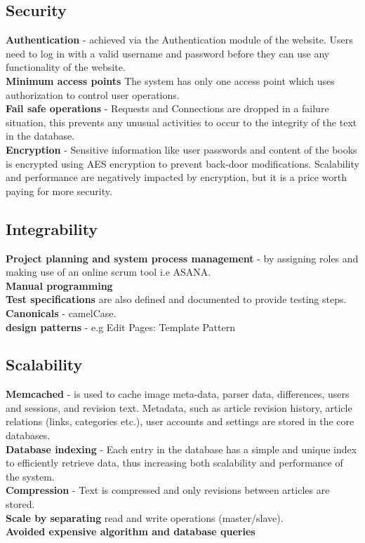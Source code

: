 \subsection{Security}
\par{\textbf{Authentication} - achieved via the Authentication module of the website. Users need to log in with a valid username and password before they can use any functionality of the website. 
\\\textbf{Minimum access points}  The system has only one access point which uses authorization to control user operations.
\\\textbf{Fail safe operations} - Requests and Connections are dropped in a failure situation, this prevents any unusual activities to occur to the integrity of the text in the database.
\\\textbf{Encryption} - Sensitive information like user passwords and content of the books is encrypted using AES encryption to prevent back-door modifications. Scalability and performance are negatively impacted by encryption, but it is a price worth paying for more security.
 }

\subsection{Integrability}
\par{\textbf{Project planning and system process management} - by assigning roles and making use of an online scrum tool i.e ASANA.
\\\textbf{Manual programming}
\\\textbf{Test specifications} are also defined and documented to provide testing steps.
\\\textbf{Canonicals} - camelCase.
\\\textbf{design patterns} - e.g Edit Pages: Template Pattern}

\subsection{Scalability}
\par{\textbf{Memcached} - is used to cache image meta-data, parser data, differences, users and sessions, and revision text. Metadata, such as article revision history, article relations (links, categories etc.), user accounts and settings are stored in the core databases.
\\\textbf{Database indexing} - Each entry in the database has a simple and unique index to efficiently retrieve data, thus increasing both scalability and performance of the system. 
\\\textbf{Compression} - Text is compressed and only revisions between articles are stored. 
\\\textbf{Scale by separating} read and write operations (master/slave).
\\\textbf{Avoided expensive algorithm and database queries}
}
